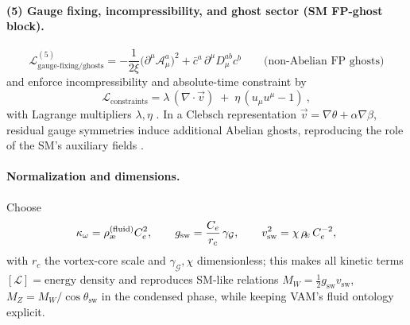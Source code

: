 \documentclass[11pt]{article}
\begin{document}
    \paragraph{(5) Gauge fixing, incompressibility, and ghost sector (SM FP-ghost block).}
    \[
        \boxed{\ \mathcal{L}^{(5)}_{\text{gauge-fixing/ghosts}}=
            -\frac{1}{2\xi}\big(\partial^\mu \mathcal{A}_\mu^a\big)^2
            +\bar{c}^a\,\partial^\mu D_\mu^{ab} c^b
            \qquad\text{(non-Abelian FP ghosts)}\ }
    \]
    and enforce incompressibility and absolute-time constraint by
    \[
        \boxed{\ \mathcal{L}_\text{constraints}=\lambda\,(\nabla\!\cdot\!\vec v)\;+\; \eta\,(u_\mu u^\mu-1)\ ,\ }
    \]
    with Lagrange multipliers \(\lambda,\eta\) \cite{Iskandarani2025EmergentGR,Iskandarani2025TimeDilation}.
    In a Clebsch representation \( \vec v=\nabla \theta + \alpha \nabla \beta \), residual gauge symmetries induce additional Abelian ghosts, reproducing the role of the SM’s auxiliary fields \cite{Iskandarani2025TopLag}.

    \paragraph{Normalization and dimensions.}
    Choose
    \[
        \kappa_\omega=\rho_\text{\ae}^{(\text{fluid})} C_e^2,\qquad
        g_\text{sw}=\frac{C_e}{r_c}\,\gamma_\mathcal{G},\qquad
        v_\text{sw}^2=\chi\,\rho_{\mkern-2mu\scriptscriptstyle\boldsymbol\!E}\, C_e^{-2},
    \]
    with \(r_c\) the vortex-core scale and \(\gamma_\mathcal{G},\chi\) dimensionless; this makes all kinetic terms \([\mathcal{L}]=\text{energy density}\) and reproduces SM-like relations \(M_W=\tfrac{1}{2}g_\text{sw}v_\text{sw}\), \(M_Z=M_W/\cos\theta_\text{sw}\) in the condensed phase, while keeping VAM’s fluid ontology explicit.
\end{document}
